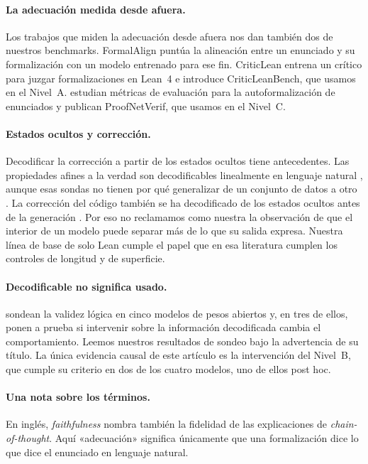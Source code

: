 \documentclass[10pt]{article}
\begin{document}
\paragraph{La adecuación medida desde afuera.}
Los trabajos que miden la adecuación desde afuera nos dan también dos de nuestros benchmarks.
FormalAlign \citep{formalalign} puntúa la alineación entre un enunciado y su formalización con un modelo entrenado
para ese fin. CriticLean \citep{criticlean} entrena un crítico para juzgar formalizaciones en Lean~4 e introduce
CriticLeanBench, que usamos en el Nivel~A. \citet{proofnetverif} estudian métricas de evaluación para la
autoformalización de enunciados y publican ProofNetVerif, que usamos en el Nivel~C.

\paragraph{Estados ocultos y corrección.}
Decodificar la corrección a partir de los estados ocultos tiene antecedentes. Las propiedades afines a la verdad
son decodificables linealmente en lenguaje natural \citep{geometry}, aunque esas sondas no tienen por qué
generalizar de un conjunto de datos a otro \citep{orgad}. La corrección del código también se ha decodificado de
los estados ocultos antes de la generación \citep{dicicco}. Por eso no reclamamos como nuestra la observación de
que el interior de un modelo puede separar más de lo que su salida expresa. Nuestra línea de base de solo Lean
cumple el papel que en esa literatura cumplen los controles de longitud y de superficie.

\paragraph{Decodificable no significa usado.}
\citet{decodability} sondean la validez lógica en cinco modelos de pesos abiertos y, en tres de ellos, ponen a prueba si
intervenir sobre la información decodificada cambia el comportamiento. Leemos nuestros resultados de sondeo bajo la advertencia de su título. La única evidencia causal de este artículo es
la intervención del Nivel~B, que cumple su criterio en dos de los cuatro modelos, uno de ellos post hoc.

\paragraph{Una nota sobre los términos.}
En inglés, \emph{faithfulness} nombra también la fidelidad de las explicaciones de \emph{chain-of-thought}. Aquí
«adecuación» significa únicamente que una formalización dice lo que dice el enunciado en lenguaje natural.
\end{document}
